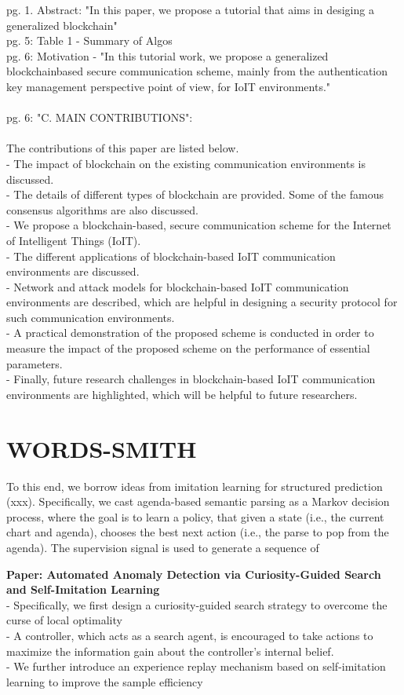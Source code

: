 \documentclass{article}
\begin{document}
pg. 1. Abstract: "In this paper, we propose a tutorial that aims in desiging a generalized blockchain"\\
pg. 5: Table 1 - Summary of Algos\\
pg. 6: Motivation - "In this tutorial work, we propose a generalized blockchainbased secure communication scheme, mainly from the authentication key management perspective point of view, for IoIT environments."\\\\
pg. 6: "C. MAIN CONTRIBUTIONS":\\\\
The contributions of this paper are listed below.\\
- The impact of blockchain on the existing communication environments is discussed.\\
- The details of different types of blockchain are provided. Some of the famous consensus algorithms are also discussed.\\
- We propose a blockchain-based, secure communication scheme for the Internet of Intelligent Things (IoIT).\\
- The different applications of blockchain-based IoIT communication environments are discussed.\\
- Network and attack models for blockchain-based IoIT communication environments are described, which are helpful in designing a security protocol for such communication environments.\\
- A practical demonstration of the proposed scheme is conducted in order to measure the impact of the proposed scheme on the performance of essential parameters.\\
- Finally, future research challenges in blockchain-based IoIT communication environments are highlighted, which will be helpful to future researchers.\\

\section{WORDS-SMITH}
To this end, we borrow ideas from imitation learning for structured prediction (xxx). Specifically, we cast agenda-based semantic parsing as a Markov decision process, where the goal is to learn a policy, that given a state (i.e., the current chart and agenda), chooses the best next action (i.e., the parse to pop from the agenda). The supervision signal is used to generate a sequence of


\textbf{Paper: Automated Anomaly Detection via Curiosity-Guided Search and Self-Imitation Learning}\\
- Specifically, we first design a curiosity-guided search strategy to overcome the curse of local optimality\\
- A controller, which acts as a search agent, is encouraged to take actions to maximize the information gain about the controller's internal belief.\\
- We further introduce an experience replay mechanism based on self-imitation learning to improve the sample efficiency\\
\end{document}
